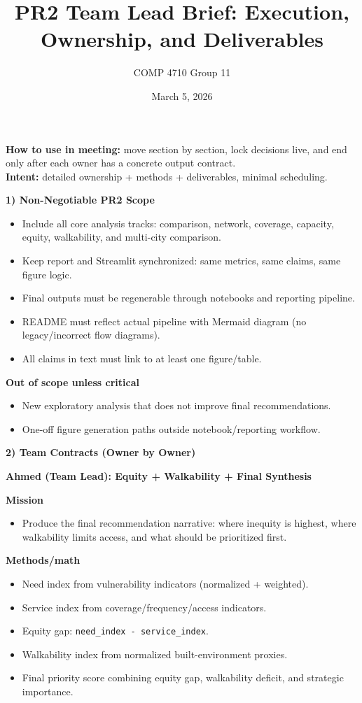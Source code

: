 \documentclass[10pt,letterpaper,twocolumn]{article}
\title{\vspace{-1.2em}PR2 Team Lead Brief: Execution, Ownership, and Deliverables}
\author{COMP 4710 Group 11}
\date{March 5, 2026}
\newcommand{\sectiontitle}[1]{\vspace{0.35em}\textbf{\large #1}\vspace{0.15em}}
\newcommand{\subhead}[1]{\textbf{#1}}
\begin{document}
\maketitle
\thispagestyle{empty}

\begin{center}
\small
\textbf{How to use in meeting:} move section by section, lock decisions live, and end only after each owner has a concrete output contract.\\
\textbf{Intent:} detailed ownership + methods + deliverables, minimal scheduling.
\end{center}

\sectiontitle{1) Non-Negotiable PR2 Scope}
\begin{itemize}
  \item Include all core analysis tracks: comparison, network, coverage, capacity, equity, walkability, and multi-city comparison.
  \item Keep report and Streamlit synchronized: same metrics, same claims, same figure logic.
  \item Final outputs must be regenerable through notebooks and reporting pipeline.
  \item README must reflect actual pipeline with Mermaid diagram (no legacy/incorrect flow diagrams).
  \item All claims in text must link to at least one figure/table.
\end{itemize}

\subhead{Out of scope unless critical}
\begin{itemize}
  \item New exploratory analysis that does not improve final recommendations.
  \item One-off figure generation paths outside notebook/reporting workflow.
\end{itemize}

\sectiontitle{2) Team Contracts (Owner by Owner)}

\subhead{Ahmed (Team Lead): Equity + Walkability + Final Synthesis}

\subhead{Mission}
\begin{itemize}
  \item Produce the final recommendation narrative: where inequity is highest, where walkability limits access, and what should be prioritized first.
\end{itemize}

\subhead{Methods/math}
\begin{itemize}
  \item Need index from vulnerability indicators (normalized + weighted).
  \item Service index from coverage/frequency/access indicators.
  \item Equity gap: \texttt{need\_index - service\_index}.
  \item Walkability index from normalized built-environment proxies.
  \item Final priority score combining equity gap, walkability deficit, and strategic importance.
\end{itemize}
\end{document}
